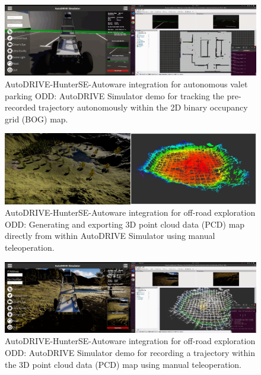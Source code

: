 \begin{figure}[H]
    \centering
    \includegraphics[width=\linewidth]{Figures/fig27.png}
    \caption{AutoDRIVE-HunterSE-Autoware integration for autonomous valet parking ODD: AutoDRIVE Simulator demo for tracking the pre-recorded trajectory autonomously within the 2D binary occupancy grid (BOG) map.}
    \label{fig: figure27}
\end{figure}

\begin{figure}[H]
    \centering
    \includegraphics[width=\linewidth]{Figures/fig28.png}
    \caption{AutoDRIVE-HunterSE-Autoware integration for off-road exploration ODD: Generating and exporting 3D point cloud data (PCD) map directly from within AutoDRIVE Simulator using manual teleoperation.}
    \label{fig: figure28}
\end{figure}

\begin{figure}[H]
    \centering
    \includegraphics[width=\linewidth]{Figures/fig29.png}
    \caption{AutoDRIVE-HunterSE-Autoware integration for off-road exploration ODD: AutoDRIVE Simulator demo for recording a trajectory within the 3D point cloud data (PCD) map using manual teleoperation.}
    \label{fig: figure29}
\end{figure}

